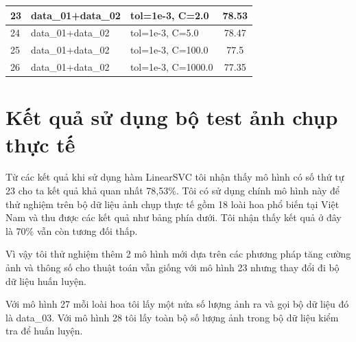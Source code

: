 \documentclass[12pt]{report}
\begin{document}
\begin{table}
\begin{tabular}{|l|l|l|c|}
			23  & data\_01+data\_02                                               & tol=1e-3, C=2.0                                                             & 78.53                                                                 \\ \hline
			24  & data\_01+data\_02                                               & tol=1e-3, C=5.0                                                             & 78.47                                                                 \\ \hline
			25  & data\_01+data\_02                                               & tol=1e-3, C=100.0                                                           & 77.5                                                                  \\ \hline
			26  & data\_01+data\_02                                               & tol=1e-3, C=1000.0                                                          & 77.35                                                                 \\ \hline
			\end{tabular}
		\end{table}
		

		
		\section{Kết quả sử dụng bộ test ảnh chụp thực tế}
		Từ các kết quả khi sử dụng hàm LinearSVC tôi nhận thấy mô hình có số thứ tự  23 cho ta kết quả khả quan nhất 78,53\%. Tôi có sử dụng chính mô hình này để thử nghiệm trên bộ dữ liệu ảnh chụp thực tế gồm 18 loài hoa phổ biến tại Việt Nam và thu được các kết quả như bảng phía dưới. Tôi nhận thấy kết quả ở đây là 70\% vẫn còn tương đối thấp.

		Vì vậy tôi thử nghiệm thêm 2 mô hình mới dựa trên các phương pháp tăng cường ảnh và thông số cho thuật toán vẫn giống với mô hình 23 nhưng thay đổi đi bộ dữ liệu huấn luyện.
		
		Với mô hình 27 mỗi loài hoa tôi lấy một nửa số lượng ảnh ra và gọi bộ dữ liệu đó là data\_03. Với mô hình 28 tôi lấy toàn bộ số lượng ảnh trong bộ dữ liệu kiểm tra để huấn luyện.
		
\end{document}
